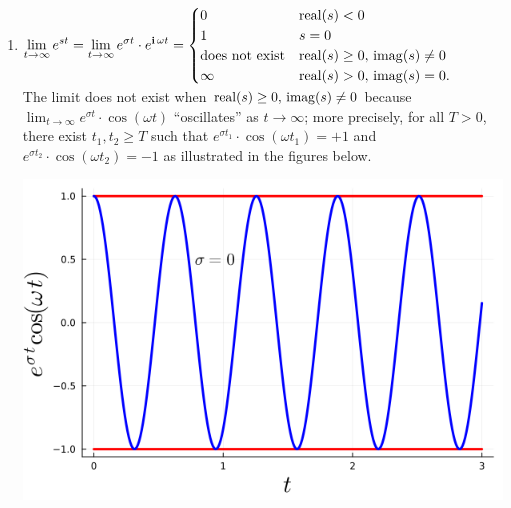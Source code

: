  \begin{enumerate}
\renewcommand{\labelenumi}{(\alph{enumi})}
\setlength{\itemsep}{.6cm}
    \item \Ans \quad  $\displaystyle \lim_{t \to \infty} e^{st} = \lim_{t \to \infty} e^{\sigma t} \cdot e^{\mathop{\bm{\mathrm i}} \omega t} = 
    \begin{cases} 0 & {\rm real}(s)<0 \\
    1 &  s=0 \\
    \text{does not exist} & {\rm real}(s)\ge0, \,  {\rm imag}(s) \neq 0\\
    \infty & {\rm real}(s)> 0, \,  {\rm imag}(s)= 0. 
    \end{cases}$ \\
    
    The limit does not exist when ${\rm real}(s)\ge0, \,  {\rm imag}(s) \neq 0$ because $\displaystyle \lim_{t \to \infty} e^{\sigma t} \cdot \cos(\omega t)$ ``oscillates'' as $t \to \infty$; more precisely, for all $T>0$, there exist $t_1, t_2\ge T$ such that $ e^{\sigma t_1} \cdot \cos(\omega t_1) = +1$ and $ e^{\sigma t_2} \cdot \cos(\omega t_2) = -1$ as illustrated in the figures below.
\begin{center}
    \begin{minipage}{0.45\columnwidth}
        \includegraphics[width=\linewidth]{graphics/Chap10/nonExistenceLimitZeroSigma.png}
    \end{minipage}
    \hfill
    \begin{minipage}{0.45\columnwidth}

\end{minipage}
\end{center}
\end{enumerate}
